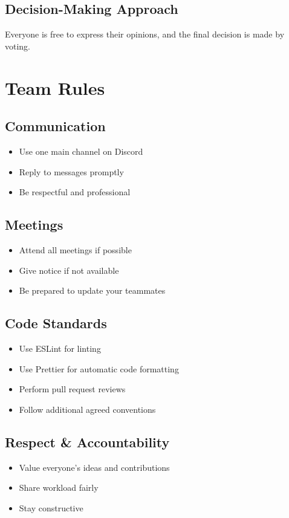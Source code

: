\documentclass[]{VUMIFTemplateClass}
\begin{document}
\subsection*{Decision-Making Approach}
Everyone is free to express their opinions, and the final decision is made by voting.

\section*{Team Rules}

\subsection*{Communication}
\begin{itemize}
    \item Use one main channel on Discord
    \item Reply to messages promptly
    \item Be respectful and professional
\end{itemize}

\subsection*{Meetings}
\begin{itemize}
    \item Attend all meetings if possible
    \item Give notice if not available
    \item Be prepared to update your teammates
\end{itemize}

\subsection*{Code Standards}
\begin{itemize}
    \item Use ESLint for linting
    \item Use Prettier for automatic code formatting
    \item Perform pull request reviews
    \item Follow additional agreed conventions
\end{itemize}

\subsection*{Respect \& Accountability}
\begin{itemize}
    \item Value everyone's ideas and contributions
    \item Share workload fairly
    \item Stay constructive
\end{itemize}
\end{document}
